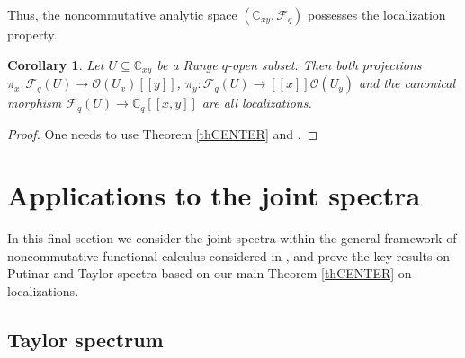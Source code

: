 \documentclass[12pt,reqno]{amsart}%
\theoremstyle{plain}
\newtheorem{corollary}{Corollary}
\numberwithin{theorem}{section} \numberwithin{equation}{section}
\numberwithin{lemma}{section}
\numberwithin{remark}{section}
\numberwithin{example}{section}
\numberwithin{proposition}{section}
\numberwithin{definition}{section}
\numberwithin{corollary}{section}
\begin{document}
Thus, the noncommutative analytic space $\left(  \mathbb{C}_{xy}%
,\mathcal{F}_{q}\right)  $ possesses the localization property.

\begin{corollary}
Let $U\subseteq\mathbb{C}_{xy}$ be a Runge $q$-open subset. Then both
projections $\pi_{x}:\mathcal{F}_{q}\left(  U\right)  \rightarrow
\mathcal{O}\left(  U_{x}\right)  \left[  \left[  y\right]  \right]  $,
$\pi_{y}:\mathcal{F}_{q}\left(  U\right)  \rightarrow\left[  \left[  x\right]
\right]  \mathcal{O}\left(  U_{y}\right)  $ and the canonical morphism
$\mathcal{F}_{q}\left(  U\right)  \rightarrow\mathbb{C}_{q}\left[  \left[
x,y\right]  \right]  $ are all localizations.
\end{corollary}

\begin{proof}
One needs to use Theorem \ref{thCENTER} and \cite[Proposition 1.8]{Tay2}.
\end{proof}

\section{Applications to the joint spectra\label{secJS}}

In this final section we consider the joint spectra within the general
framework of noncommutative functional calculus considered in \cite{DosJOT10},
and prove the key results on Putinar and Taylor spectra based on our main
Theorem \ref{thCENTER} on localizations.

\subsection{Taylor spectrum}
\end{document}
